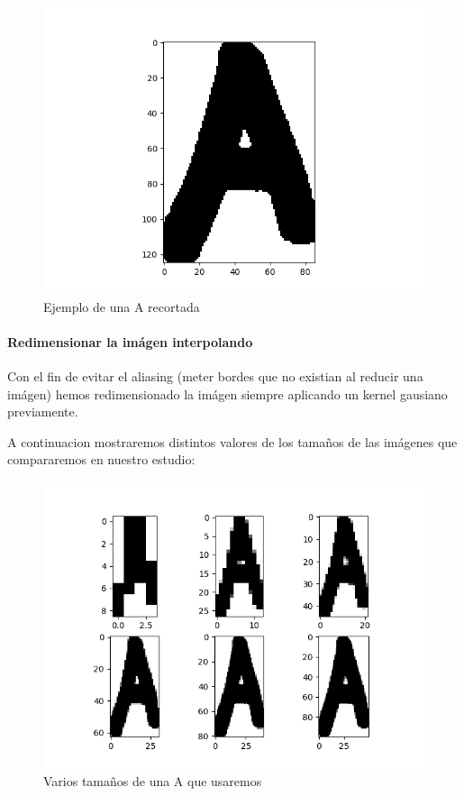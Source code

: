 \documentclass[8pt,a4paper]{article}
\begin{document}
\begin{figure}[htbp]
    \centering
    \includegraphics[scale=0.3]{./Arecortada.png}
    \caption{Ejemplo de una A recortada}
\end{figure}

\paragraph{Redimensionar la imágen interpolando}

Con el fin de evitar el aliasing (meter bordes que no existian al reducir una imágen) hemos redimensionado la imágen siempre aplicando un kernel gausiano previamente.

A continuacion mostraremos distintos valores de los tamaños de las imágenes que compararemos en nuestro estudio:

\begin{figure}[htbp]
   \centering
    \includegraphics[scale=0.3]{./A_Variando_Tam.png}
    \caption{Varios tamaños de una A que usaremos}
\end{figure}
\end{document}
